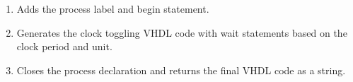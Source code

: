 \documentclass[letterpaper,10pt,english]{sphinxmanual}
\begin{document}
\begin{fulllineitems}
\begin{fulllineitems}
\begin{description}
\begin{enumerate}
\item {} 
\sphinxAtStartPar
Adds the process label and begin statement.

\item {} 
\sphinxAtStartPar
Generates the clock toggling VHDL code with wait statements based on the clock period and unit.

\item {} 
\sphinxAtStartPar
Closes the process declaration and returns the final VHDL code as a string.

\end{enumerate}

\end{description}

\end{fulllineitems}


\end{fulllineitems}

\end{document}
